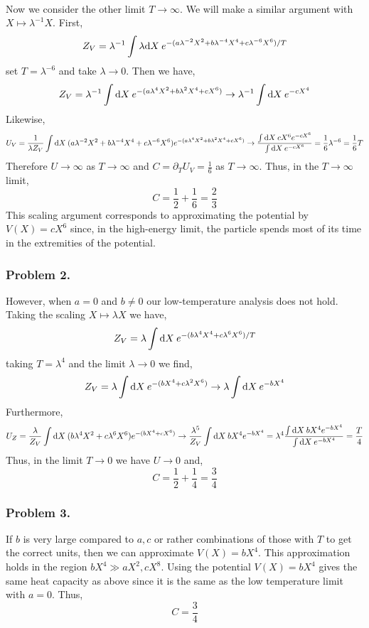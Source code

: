 \documentclass[12pt]{article}
\begin{document}
\bigskip\\
Now we consider the other limit $T \to \infty$. We will make a similar argument with $X \mapsto \lambda^{-1} X$. First, 
\[ Z_V = \lambda^{-1} \int \lambda \mathrm{d}X \: e^{-(a \lambda^{-2} X^2 + b \lambda^{-4} X^4 + c \lambda^{-6} X^6) / T} \]
set $T = \lambda^{-6}$ and take $\lambda \to 0$. 
Then we have,
\[ Z_V = \lambda^{-1} \int \mathrm{d}X \: e^{-(a \lambda^4 X^2 + b \lambda^2 X^4 + c X^6)} \to \lambda^{-1} \int \mathrm{d}X \: e^{-c X^4} \]
Likewise,
\[ U_V = \frac{1}{\lambda Z_V} \int \mathrm{d}X \: (a \lambda^{-2} X^2 + b \lambda^{-4} X^4 + c \lambda^{-6} X^6) e^{-(a \lambda^4 X^2 + b \lambda^2 X^4 + c X^6)} \to \frac{\int \mathrm{d}X \: c X^6 e^{- c X^6}}{\int \mathrm{d}X \: e^{- c X^6}} = \frac{1}{6} \lambda^{-6} = \frac{1}{6} T \]
Therefore $U \to \infty$ as $T \to \infty$ and $C = \partial_T U_V = \frac{1}{6}$ as $T \to \infty$. 
Thus, in the $T \to \infty$ limit,
\[ C = \frac{1}{2} + \frac{1}{6} = \frac{2}{3} \]
This scaling argument corresponds to approximating the potential by $V(X) = c X^6$ since, in the high-energy limit, the particle spends most of its time in the extremities of the potential. 

\subsubsection{Problem 2.}

However, when $a = 0$ and $b \neq 0$ our low-temperature analysis does not hold. Taking the scaling $X \mapsto \lambda X$ we have,
\[ Z_V = \lambda \int \mathrm{d}X \: e^{-(b \lambda^4 X^4 + c \lambda^6 X^6)/T} \]
taking $T = \lambda^4$ and the limit $\lambda \to 0$ we find,
\[  Z_V = \lambda \int \mathrm{d}X \: e^{- (b X^4 + c \lambda^2 X^6)} \to \lambda \int \mathrm{d}X \: e^{-b X^4} \]
Furthermore,
\[ U_Z = \frac{\lambda}{Z_V} \int \mathrm{d}X \: (b \lambda^4 X^2 + c \lambda^6 X^6) e^{-(b X^4 + c X^6)} \to \frac{\lambda^5}{Z_V} \int \mathrm{d}X \: b X^4 e^{-b X^4} = \lambda^4 \frac{\int \mathrm{d}X \: b X^4 e^{-b X^4}}{\int \mathrm{d}X \: e^{-b X^4}} = \frac{T}{4} \]
Thus, in the limit $T \to 0$ we have $U \to 0$ and,
\[ C = \frac{1}{2} + \frac{1}{4} = \frac{3}{4} \]

\subsubsection{Problem 3.}

If $b$ is very large compared to $a,c$ or rather combinations of those with $T$ to get the correct units, then we can approximate $V(X) = b X^4$. This approximation holds in the region $b X^4 \gg a X^2, c X^8$. Using the potential $V(X) = b X^4$ gives the same heat capacity as above since it is the same as the low temperature limit with $a = 0$. Thus,
\[ C = \frac{3}{4} \]
\end{document}

